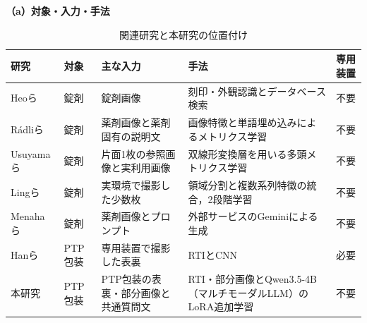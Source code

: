 \documentclass[uplatex,dvipdfmx]{jsarticle}
\begin{document}
\begin{table}[htbp]
  \centering
  \caption{関連研究と本研究の位置付け}
  \label{tab:related_comparison}
  \small
  \renewcommand{\arraystretch}{1.25}
  \setlength{\tabcolsep}{3.5pt}
  \textbf{（a）対象・入力・手法}\\[1mm]
  \begin{tabularx}{\textwidth}{|>{\raggedright\arraybackslash}p{1.55cm}|>{\raggedright\arraybackslash}p{1.4cm}|>{\raggedright\arraybackslash}X|>{\raggedright\arraybackslash}X|>{\centering\arraybackslash}p{1.25cm}|}
    \hline
    研究 & 対象 & 主な入力 & 手法 & 専用装置 \\ \hline
    Heoら\cite{heo2023pill} & 錠剤 & 錠剤画像 & 刻印・外観認識とデータベース検索 & 不要 \\ \hline
    Rádliら\cite{radli2024word,radli2024metric} & 錠剤 & 薬剤画像と薬剤固有の説明文 & 画像特徴と単語埋め込みによるメトリクス学習 & 不要 \\ \hline
    Usuyamaら\cite{usuyama2020epillid} & 錠剤 & 片面1枚の参照画像と実利用画像 & 双線形変換層を用いる多頭メトリクス学習 & 不要 \\ \hline
    Lingら\cite{ling2020fewshot} & 錠剤 & 実環境で撮影した少数枚 & 領域分割と複数系列特徴の統合，2段階学習 & 不要 \\ \hline
    Menahaら\cite{menaha2024gemini} & 錠剤 & 薬剤画像とプロンプト & 外部サービスのGeminiによる生成 & 不要 \\ \hline
    Hanら\cite{han2021blister} & PTP包装 & 専用装置で撮影した表裏 & RTIとCNN & 必要 \\ \hline
    本研究 & PTP包装 & PTP包装の表裏・部分画像と共通質問文 & RTI・部分画像とQwen3.5-4B（マルチモーダルLLM）のLoRA追加学習 & 不要 \\ \hline
  \end{tabularx}


\end{table}
\end{document}
